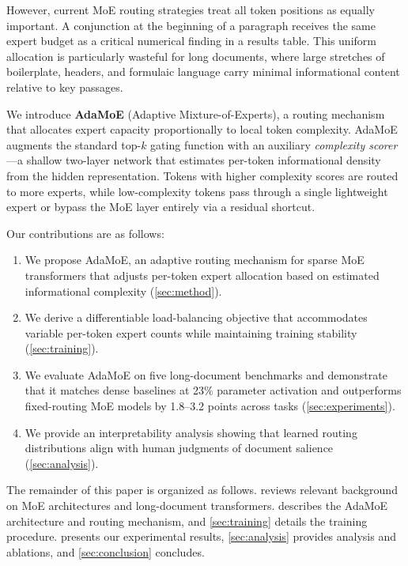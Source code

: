 \documentclass[11pt,a4paper]{article}
\begin{document}
However, current MoE routing strategies treat all token positions as equally important.
A conjunction at the beginning of a paragraph receives the same expert budget as a critical
numerical finding in a results table.
This uniform allocation is particularly wasteful for long documents, where large stretches of
boilerplate, headers, and formulaic language carry minimal informational content relative to
key passages.

We introduce \textbf{AdaMoE} (Adaptive Mixture-of-Experts), a routing mechanism that
allocates expert capacity proportionally to local token complexity.
AdaMoE augments the standard top-$k$ gating function with an auxiliary \emph{complexity
scorer}---a shallow two-layer network that estimates per-token informational density from the
hidden representation.
Tokens with higher complexity scores are routed to more experts, while low-complexity tokens
pass through a single lightweight expert or bypass the MoE layer entirely via a residual
shortcut.

Our contributions are as follows:
\begin{enumerate}[leftmargin=*]
  \item We propose AdaMoE, an adaptive routing mechanism for sparse MoE transformers that
        adjusts per-token expert allocation based on estimated informational complexity
        (\cref{sec:method}).
  \item We derive a differentiable load-balancing objective that accommodates variable
        per-token expert counts while maintaining training stability
        (\cref{sec:training}).
  \item We evaluate AdaMoE on five long-document benchmarks and demonstrate that it matches
        dense baselines at 23\% parameter activation and outperforms fixed-routing MoE
        models by 1.8--3.2 points across tasks (\cref{sec:experiments}).
  \item We provide an interpretability analysis showing that learned routing distributions
        align with human judgments of document salience (\cref{sec:analysis}).
\end{enumerate}

The remainder of this paper is organized as follows.
 reviews relevant background on MoE architectures and long-document
transformers.
 describes the AdaMoE architecture and routing mechanism, and
\cref{sec:training} details the training procedure.
 presents our experimental results, \cref{sec:analysis} provides
analysis and ablations, and \cref{sec:conclusion} concludes.
\end{document}
